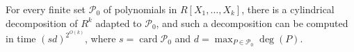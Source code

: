 For every finite set \(\mathcal P_0\) of polynomials in \(R[X_1,\ldots,X_k]\), there is a cylindrical decomposition of \(R^k\) adapted to \(\mathcal P_0\), and such a decomposition can be computed in time \((sd)^{2^{O(k)}}\), where \(s=\operatorname{card}\mathcal P_0\) and \(d=\max_{P\in\mathcal P_0}\deg(P)\).